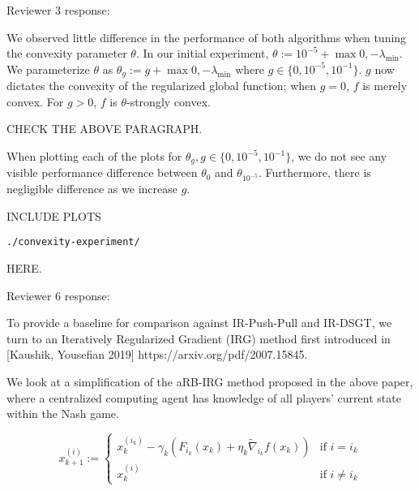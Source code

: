 Reviewer 3 response:

We observed little difference in the performance of both algorithms when tuning the convexity parameter $\theta$. In our initial experiment, $\theta := 10^{-5} + \max{0, -\lambda_{\min}}$. We parameterize $\theta$ as $\theta_g := g + \max{0, -\lambda_{\min}}$ where $g \in \{0, 10^{-5}, 10^{-1}\}$. $g$ now dictates the convexity of the regularized global function; when $g = 0$, $f$ is merely convex. For $g > 0$, $f$ is $\theta$-strongly convex.

CHECK THE ABOVE PARAGRAPH.

When plotting each of the plots for $\theta_g, g \in \{0, 10^{-5}, 10^{-1}\}$, we do not see any visible performance difference between $\theta_0$ and $\theta_{10^{-5}}$. Furthermore, there is negligible difference as we increase $g$.

INCLUDE PLOTS \begin{verbatim}./convexity-experiment/\end{verbatim} HERE.


Reviewer 6 response:

To provide a baseline for comparison against IR-Push-Pull and IR-DSGT, we turn to an Iteratively Regularized Gradient (IRG) method first introduced in [Kaushik, Yousefian 2019] https://arxiv.org/pdf/2007.15845.

We look at a simplification of the aRB-IRG method proposed in the above paper, where a centralized computing agent has knowledge of all players' current state within the Nash game.

\[
x_{k+1}^{(i)} := \begin{cases}
    x_k^{(i_k)} - \gamma_k \left( F_{i_k}(x_k) + \eta_k \tilde{\nabla}_{i_k} f(x_k) \right) & \text{if } i = i_k \\
    x_{k}^{(i)} & \text{if } i \neq i_k
\end{cases}
\]